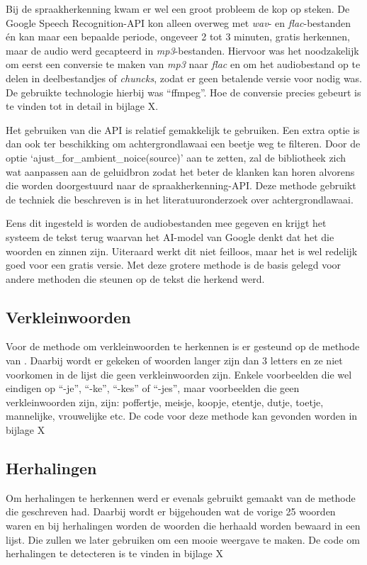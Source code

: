 Bij de spraakherkenning kwam er wel een groot probleem de kop op steken. De Google Speech Recognition-API kon alleen overweg met \textit{wav}- en \textit{flac}-bestanden én kan maar een bepaalde periode, ongeveer 2 tot 3 minuten, gratis herkennen, maar de audio werd gecapteerd in \textit{mp3}-bestanden. Hiervoor was het noodzakelijk om eerst een conversie te maken van \textit{mp3} naar \textit{flac} en om het audiobestand op te delen in deelbestandjes of \textit{chuncks}, zodat er geen betalende versie voor nodig was. De gebruikte technologie hierbij was ``ffmpeg''. Hoe de conversie precies gebeurt is te vinden tot in detail in bijlage X.

Het gebruiken van die API is relatief gemakkelijk te gebruiken. Een extra optie is dan ook ter beschikking om achtergrondlawaai een beetje weg te filteren. Door de optie `ajust\_for\_ambient\_noice(source)' aan te zetten, zal de bibliotheek zich wat aanpassen aan de geluidbron zodat het beter de klanken kan horen alvorens die worden doorgestuurd naar de spraakherkenning-API. Deze methode gebruikt de techniek die beschreven is in het literatuuronderzoek over achtergrondlawaai.

Eens dit ingesteld is worden de audiobestanden mee gegeven en krijgt het systeem de tekst terug waarvan het AI-model van Google denkt dat het die woorden en zinnen zijn. Uiteraard werkt dit niet feilloos, maar het is wel redelijk goed voor een gratis versie. Met deze grotere methode is de basis gelegd voor andere methoden die steunen op de tekst die herkend werd.

\subsection{Verkleinwoorden}
Voor de methode om verkleinwoorden te herkennen is er gesteund op de methode van \textcite{Standaert2021}. Daarbij wordt er gekeken of woorden langer zijn dan 3 letters en ze niet voorkomen in de lijst die geen verkleinwoorden zijn. Enkele voorbeelden die wel eindigen op ``-je'', ``-ke'', ``-kes'' of ``-jes'', maar voorbeelden die geen verkleinwoorden zijn, zijn: poffertje, meisje, koopje, etentje, dutje, toetje, mannelijke, vrouwelijke etc. De code voor deze methode kan gevonden worden in bijlage X

\subsection{Herhalingen}
Om herhalingen te herkennen werd er evenals gebruikt gemaakt van de methode die \textcite{Standaert2021} geschreven had. Daarbij wordt er bijgehouden wat de vorige 25 woorden waren en bij herhalingen worden de woorden die herhaald worden bewaard in een lijst. Die zullen we later gebruiken om een mooie weergave te maken.
De code om herhalingen te detecteren is te vinden in bijlage X

